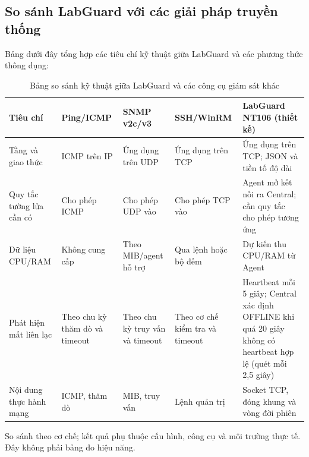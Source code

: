 \documentclass[12pt,a4paper]{article}
\begin{document}
\subsection{So sánh LabGuard với các giải pháp truyền thống}
Bảng dưới đây tổng hợp các tiêu chí kỹ thuật giữa LabGuard và các phương thức thông dụng:

\begin{table}[H]
  \centering
  \caption{Bảng so sánh kỹ thuật giữa LabGuard và các công cụ giám sát khác}
  \label{tab:comparison_tools}
  \begingroup
  \fontsize{10.5}{12.6}\selectfont
  \setlength{\tabcolsep}{4pt}
  \renewcommand{\arraystretch}{1.15}
  \begin{tabularx}{\textwidth}{|>{\raggedright\arraybackslash}p{}|>{\raggedright\arraybackslash}p{}|>{\raggedright\arraybackslash}p{}|>{\raggedright\arraybackslash}p{}|>{\raggedright\arraybackslash}X|}
    \hline
    \rowcolor{lgDeepBlue}
    \color{white}\textbf{Tiêu chí} & \color{white}\textbf{Ping/ICMP} & \color{white}\textbf{SNMP v2c/v3} & \color{white}\textbf{SSH/WinRM} & \color{white}\textbf{LabGuard NT106 (thiết kế)} \\
    \hline
    Tầng và giao thức & ICMP trên IP & Ứng dụng trên UDP & Ứng dụng trên TCP & Ứng dụng trên TCP; JSON và tiền tố độ dài \\
    \hline
    Quy tắc tường lửa cần có & Cho phép ICMP & Cho phép UDP vào & Cho phép TCP vào & Agent mở kết nối ra Central; cần quy tắc cho phép tương ứng \\
    \hline
    Dữ liệu CPU/RAM & Không cung cấp & Theo MIB/agent hỗ trợ & Qua lệnh hoặc bộ đếm & Dự kiến thu CPU/RAM từ Agent \\
    \hline
    Phát hiện mất liên lạc & Theo chu kỳ thăm dò và timeout & Theo chu kỳ truy vấn và timeout & Theo cơ chế kiểm tra và timeout & Heartbeat mỗi 5 giây; Central xác định OFFLINE khi quá 20 giây không có heartbeat hợp lệ (quét mỗi 2,5 giây) \\
    \hline
    Nội dung thực hành mạng & ICMP, thăm dò & MIB, truy vấn & Lệnh quản trị & Socket TCP, đóng khung và vòng đời phiên \\
    \hline
  \end{tabularx}
  \par\smallskip\raggedright
  So sánh theo cơ chế; kết quả phụ thuộc cấu hình, công cụ và môi trường thực tế. Đây không phải bảng đo hiệu năng.
  \endgroup
\end{table}
\end{document}
